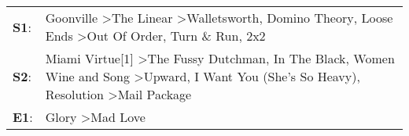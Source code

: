 \begin{supertabular}{p{0.03\textwidth}p{0.92\textwidth}}
 \textbf{S1}:  &                                         Goonville\textsuperscript{} \textgreater \enspace The Linear\textsuperscript{} \textgreater \enspace Walletsworth\textsuperscript{}, \enspace Domino Theory\textsuperscript{}, \enspace Loose Ends\textsuperscript{} \textgreater \enspace Out Of Order\textsuperscript{}, \enspace Turn \& Run\textsuperscript{}, \enspace 2x2\textsuperscript{}  \enspace  \\
 \textbf{S2}:  &  Miami Virtue[1]\textsuperscript{} \textgreater \enspace The Fussy Dutchman\textsuperscript{}, \enspace In The Black\textsuperscript{}, \enspace Women Wine and Song\textsuperscript{} \textgreater \enspace Upward\textsuperscript{}, \enspace I Want You (She's So Heavy)\textsuperscript{}, \enspace Resolution\textsuperscript{} \textgreater \enspace Mail Package\textsuperscript{}  \enspace  \\
 \textbf{E1}:  &                                                                                                                                                                                                                                                                                                                  Glory\textsuperscript{} \textgreater \enspace Mad Love\textsuperscript{}  \enspace  \\
\end{supertabular}
